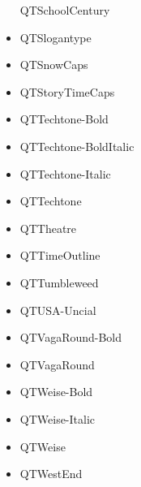\documentclass[12pt]{article}
\begin{document}
\begin{itemize}
QTSchoolCentury\item QTSlogantype\item QTSnowCaps\item QTStoryTimeCaps\item QTTechtone-Bold\item QTTechtone-BoldItalic\item QTTechtone-Italic\item QTTechtone\item QTTheatre\item QTTimeOutline\item QTTumbleweed\item QTUSA-Uncial\item QTVagaRound-Bold\item QTVagaRound\item QTWeise-Bold\item QTWeise-Italic\item QTWeise\item QTWestEnd
\end{itemize}
\end{document}
